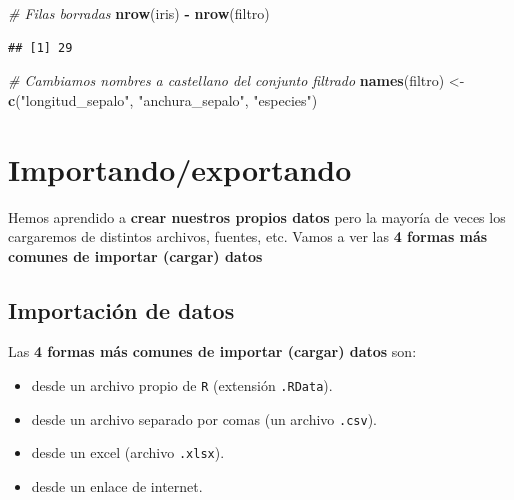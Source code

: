 \documentclass[11pt,]{book}
\newenvironment{Shaded}{\begin{snugshade}}{\end{snugshade}}
\newcommand{\CommentTok}[1]{\textcolor[rgb]{0.37,0.37,0.37}{\textit{#1}}}
\newcommand{\KeywordTok}[1]{\textcolor[rgb]{0.27,0.27,0.27}{\textbf{#1}}}
\newcommand{\NormalTok}[1]{#1}
\newcommand{\OperatorTok}[1]{\textcolor[rgb]{0.43,0.43,0.43}{\textbf{#1}}}
\newcommand{\StringTok}[1]{\textcolor[rgb]{0.5,0.5,0.5}{#1}}
\providecommand{\tightlist}{%
  \setlength{\itemsep}{0pt}\setlength{\parskip}{0pt}}
\begin{document}
\begin{Shaded}
\begin{Highlighting}[]
\CommentTok{# Filas borradas}
\KeywordTok{nrow}\NormalTok{(iris) }\OperatorTok{-}\StringTok{ }\KeywordTok{nrow}\NormalTok{(filtro)}
\end{Highlighting}
\end{Shaded}

\begin{verbatim}
## [1] 29
\end{verbatim}

\begin{Shaded}
\begin{Highlighting}[]
\CommentTok{# Cambiamos nombres a castellano del conjunto filtrado}
\KeywordTok{names}\NormalTok{(filtro) <-}\StringTok{ }\KeywordTok{c}\NormalTok{(}\StringTok{"longitud_sepalo"}\NormalTok{, }\StringTok{"anchura_sepalo"}\NormalTok{, }\StringTok{"especies"}\NormalTok{)}
\end{Highlighting}
\end{Shaded}

\hypertarget{importar_exportar}{%
\chapter{Importando/exportando}\label{importar_exportar}}

Hemos aprendido a \textbf{crear nuestros propios datos} pero la mayoría de veces los cargaremos de distintos archivos, fuentes, etc. Vamos a ver las \textbf{4 formas más comunes de importar (cargar) datos}

\hypertarget{importaciuxf3n-de-datos}{%
\section{Importación de datos}\label{importaciuxf3n-de-datos}}

Las \textbf{4 formas más comunes de importar (cargar) datos} son:

\begin{itemize}
\tightlist
\item
  desde un archivo propio de \texttt{R} (extensión \texttt{.RData}).
\item
  desde un archivo separado por comas (un archivo \texttt{.csv}).
\item
  desde un excel (archivo \texttt{.xlsx}).
\item
  desde un enlace de internet.
\end{itemize}
\end{document}

